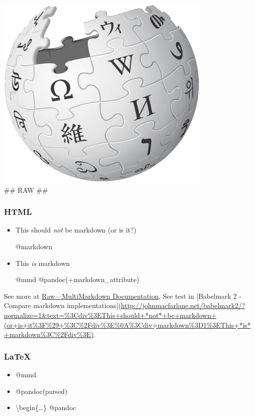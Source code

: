 \documentclass[]{article}
\begin{document}
\includegraphics{image.png}\\
\#\# RAW \#\#

\subsubsection{HTML}\label{html}

\begin{itemize}
\item
  This should \emph{not} be markdown (or is it?)

  @markdown
\item
  This \emph{is} markdown

  @mmd @pandoc(+markdown\_attribute)
\end{itemize}

See more at
\href{http://fletcher.github.io/MultiMarkdown-5/raw.html}{Raw---MultiMarkdown
Documentation}. See test in {[}Babelmark 2 - Compare markdown
implementations{]}(\url{http://johnmacfarlane.net/babelmark2/?normalize=1\&text=\%3Cdiv\%3EThis+should+*not*+be+markdown+(or+is+it\%3F\%29+\%3C\%2Fdiv\%3E\%0A\%3Cdiv+markdown\%3D1\%3EThis+*is*+markdown\%3C\%2Fdiv\%3E)}.

\subsubsection{LaTeX}\label{latex}

\begin{itemize}
\item
  @mmd
\item
  \newcommand\rawlatex{} 

  @pandoc(parsed)
\item
  \textbackslash{}begin\{\ldots{}\} @pandoc
\end{itemize}
\end{document}
